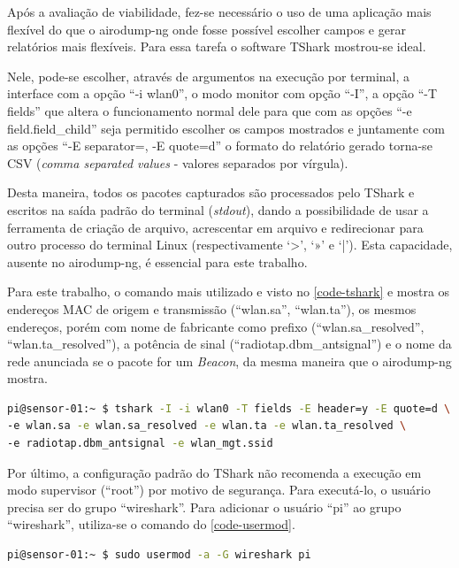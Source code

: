 Após a avaliação de viabilidade, fez-se necessário o uso de uma aplicação mais
flexível do que o airodump-ng onde fosse possível escolher campos e gerar
relatórios mais flexíveis. Para essa tarefa o software TShark mostrou-se
ideal.

Nele, pode-se escolher, através de argumentos na execução por terminal, a
interface com a opção “-i wlan0”, o modo monitor com opção “-I”, a opção “-T
fields” que altera o funcionamento normal dele para que com as opções “-e
field.field\_child” seja permitido escolher os campos mostrados e juntamente com
as opções “-E separator=, -E quote=d” o formato do relatório gerado torna-se CSV
(\emph{comma separated values} - valores separados por vírgula).

Desta maneira, todos os pacotes capturados são processados pelo TShark e
escritos na saída padrão do terminal (\emph{stdout}), dando a possibilidade de
usar a ferramenta de criação de arquivo, acrescentar em arquivo e redirecionar
para outro processo do terminal Linux (respectivamente ‘>’, ‘»’ e ‘|’). Esta
capacidade, ausente no airodump-ng, é essencial para este trabalho.

Para este trabalho, o comando mais utilizado e visto no \autoref{code-tshark} e
mostra os endereços MAC de origem e transmissão (``wlan.sa'', ``wlan.ta''), os
mesmos endereços, porém com nome de fabricante como prefixo
(``wlan.sa\_resolved'', ``wlan.ta\_resolved''), a potência de sinal
(``radiotap.dbm\_antsignal'') e o nome da rede anunciada se o pacote for um
\emph{Beacon}, da mesma maneira que o airodump-ng mostra.

\begin{lstlisting}[language=bash,caption={TShark e opções},label=code-tshark]
pi@sensor-01:~ $ tshark -I -i wlan0 -T fields -E header=y -E quote=d \
-e wlan.sa -e wlan.sa_resolved -e wlan.ta -e wlan.ta_resolved \
-e radiotap.dbm_antsignal -e wlan_mgt.ssid
\end{lstlisting}

Por último, a configuração padrão do TShark não recomenda a execução em modo
supervisor (``root'') por motivo de segurança. Para executá-lo, o usuário
precisa ser do grupo ``wireshark''. Para adicionar o usuário ``pi'' ao grupo
``wireshark'', utiliza-se o comando do \autoref{code-usermod}.

\begin{lstlisting}[language=bash,caption={Adição do usuário pi ao grupo wireshark},label=code-usermod]
pi@sensor-01:~ $ sudo usermod -a -G wireshark pi
\end{lstlisting}

